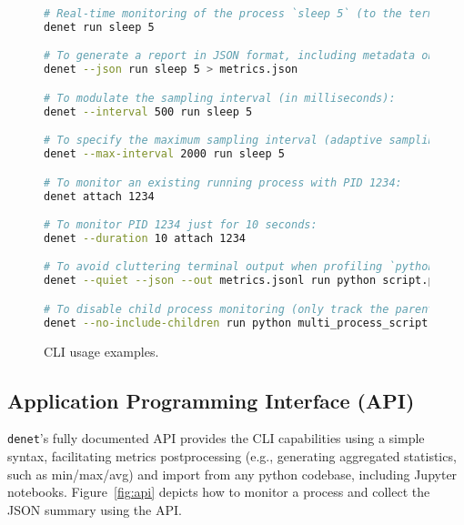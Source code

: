 \documentclass[10pt]{article}
\begin{document}
\begin{figure}[H]

\begin{lstlisting}[frame=single,language=bash]
# Real-time monitoring of the process `sleep 5` (to the terminal):
denet run sleep 5

# To generate a report in JSON format, including metadata on the first line:
denet --json run sleep 5 > metrics.json

# To modulate the sampling interval (in milliseconds):
denet --interval 500 run sleep 5

# To specify the maximum sampling interval (adaptive sampling mode):
denet --max-interval 2000 run sleep 5

# To monitor an existing running process with PID 1234:
denet attach 1234

# To monitor PID 1234 just for 10 seconds:
denet --duration 10 attach 1234

# To avoid cluttering terminal output when profiling `python script.py`:
denet --quiet --json --out metrics.jsonl run python script.py

# To disable child process monitoring (only track the parent process):
denet --no-include-children run python multi_process_script.py
\end{lstlisting}

    \caption{CLI usage examples.}
    \label{fig:cli}
\end{figure}

\subsection*{Application Programming Interface (API)}

\texttt{denet}’s fully documented API provides the CLI capabilities using a simple syntax, facilitating metrics postprocessing (e.g., generating aggregated statistics, such as min/max/avg) and import from any python codebase, including Jupyter notebooks. Figure~\ref{fig:api} depicts how to monitor a process and collect the JSON summary using the API.
\end{document}
